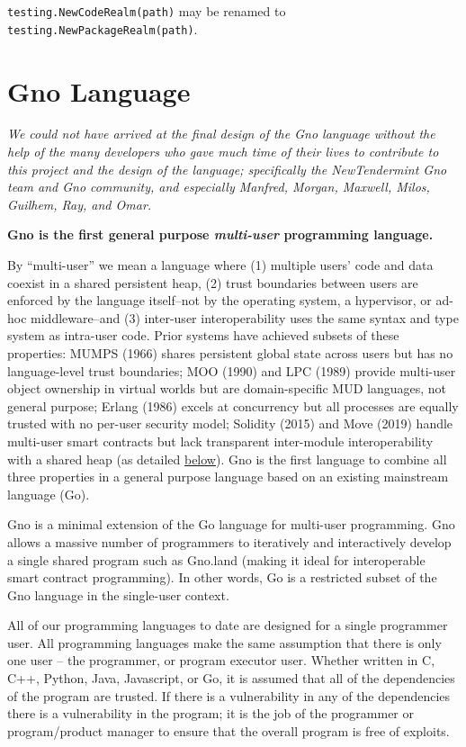 \documentclass[12pt,a4paper]{article}
\newcommand{\passthrough}[1]{#1}
\begin{document}
\passthrough{\lstinline!testing.NewCodeRealm(path)!} may be renamed to
\passthrough{\lstinline!testing.NewPackageRealm(path)!}.

\newpage

\section{Gno Language}\label{gno-language}

\emph{We could not have arrived at the final design of the Gno language
without the help of the many developers who gave much time of their
lives to contribute to this project and the design of the language;
specifically the NewTendermint Gno team and Gno community, and
especially Manfred, Morgan, Maxwell, Milos, Guilhem, Ray, and Omar.}

\textbf{Gno is the first general purpose \emph{multi-user} programming
language.}

By ``multi-user'' we mean a language where (1) multiple users' code and
data coexist in a shared persistent heap, (2) trust boundaries between
users are enforced by the language itself--not by the operating system,
a hypervisor, or ad-hoc middleware--and (3) inter-user interoperability
uses the same syntax and type system as intra-user code. Prior systems
have achieved subsets of these properties: MUMPS (1966) shares
persistent global state across users but has no language-level trust
boundaries; MOO (1990) and LPC (1989) provide multi-user object
ownership in virtual worlds but are domain-specific MUD languages, not
general purpose; Erlang (1986) excels at concurrency but all processes
are equally trusted with no per-user security model; Solidity (2015) and
Move (2019) handle multi-user smart contracts but lack transparent
inter-module interoperability with a shared heap (as detailed
\hyperref[gno-vs-existing-smart-contract-platforms]{below}). Gno is the
first language to combine all three properties in a general purpose
language based on an existing mainstream language (Go).

Gno is a minimal extension of the Go language for multi-user
programming. Gno allows a massive number of programmers to iteratively
and interactively develop a single shared program such as Gno.land
(making it ideal for interoperable smart contract programming). In other
words, Go is a restricted subset of the Gno language in the single-user
context.

All of our programming languages to date are designed for a single
programmer user. All programming languages make the same assumption that
there is only one user -- the programmer, or program executor user.
Whether written in C, C++, Python, Java, Javascript, or Go, it is
assumed that all of the dependencies of the program are trusted. If
there is a vulnerability in any of the dependencies there is a
vulnerability in the program; it is the job of the programmer or
program/product manager to ensure that the overall program is free of
exploits.
\end{document}
